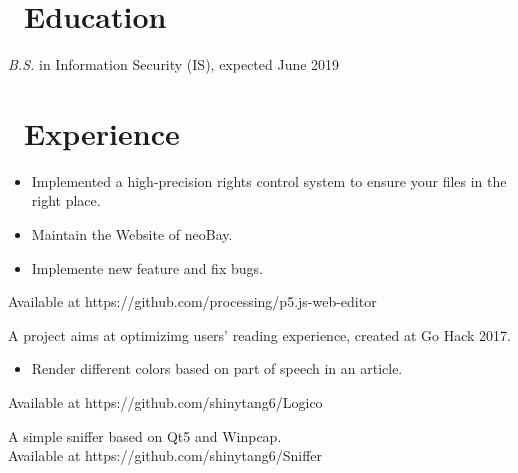 \documentclass{resume}
\begin{document}



\section{\faGraduationCap\ Education}
\textit{B.S.} in Information Security (IS), expected June 2019

\section{\faUsers\ Experience}
\begin{itemize}
  \item Implemented a high-precision rights control system to ensure your files in the right place.
  \item Maintain the Website of neoBay.
\end{itemize}

\begin{itemize}
  \item Implemente new feature and fix bugs.
\end{itemize}
Available at https://github.com/processing/p5.js-web-editor

A project aims at optimizimg users' reading experience, created at Go Hack 2017.
\begin{itemize}
  \item Render different colors based on part of speech in an article.
\end{itemize}
Available at https://github.com/shinytang6/Logico

A simple sniffer based on Qt5 and Winpcap.\\
Available at https://github.com/shinytang6/Sniffer
\end{document}
